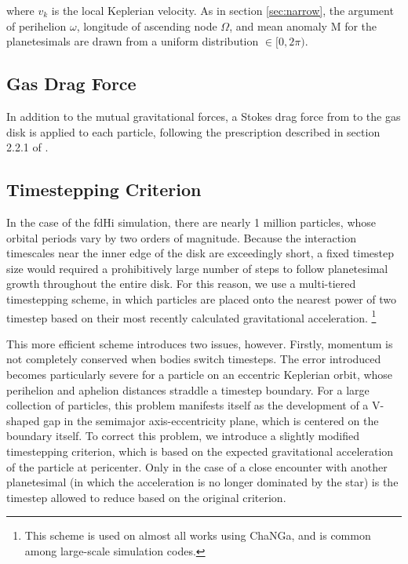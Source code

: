 \documentclass[twocolumn]{aastex63}
\begin{document}
\noindent where $v_{k}$ is the local Keplerian velocity. As in section
\ref{sec:narrow}, the argument of perihelion $\omega$, longitude of
ascending node $\Omega$, and mean anomaly M for the planetesimals are drawn from a uniform distribution $\in [0, 2 \pi)$.

\subsection{Gas Drag Force}

In addition to the mutual gravitational forces, a Stokes drag force from to the gas disk is applied to each particle, following the prescription described in section 2.2.1 of \citet{morishima10}.

\subsection{Timestepping Criterion}

In the case of the fdHi simulation, there are nearly 1 million
particles, whose orbital periods vary by two orders of magnitude. Because the
interaction timescales near the inner edge of the
disk are exceedingly short, a fixed timestep size would required a prohibitively large
number of steps to follow planetesimal growth throughout the entire
disk. For this reason, we use a multi-tiered timestepping scheme, in
which particles are placed onto the nearest power of two timestep
based on their most recently calculated gravitational
acceleration. \footnote{This scheme is used on almost all works using ChaNGa,
and is common among large-scale simulation codes.}

This more efficient scheme introduces two issues, however. Firstly,
momentum is not completely conserved when bodies switch timesteps. The
error introduced becomes particularly severe for a particle on an
eccentric Keplerian orbit, whose perihelion and aphelion distances
straddle a timestep boundary. For a large collection of particles,
this problem manifests itself as the development of a V-shaped gap in the semimajor axis-eccentricity plane, which is centered on the boundary itself. To correct this problem, we introduce a slightly modified timestepping criterion, which is based on the expected gravitational acceleration of the particle at pericenter. Only in the case of a close encounter with another planetesimal (in which the acceleration is no longer dominated by the star) is the timestep allowed to reduce based on the original criterion.
\end{document}
